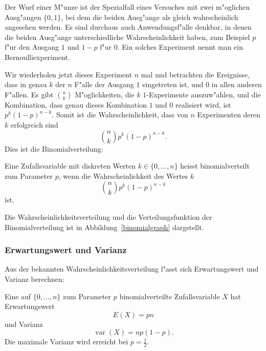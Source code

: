 Der Wurf einer M"unze ist der Spezialfall eines Versuches mit
zwei m"oglichen Ausg"angen $\{0,1\}$, bei dem die beiden Ausg"ange als
gleich wahrscheinlich angesehen werden. Es sind durchaus auch
Anwendungsf"alle denkbar, in denen die beiden Ausg"ange unterschiedliche
Wahrscheinlichkeit haben, zum Beispiel $p$ f"ur den Ausgang $1$ und $1-p$
f"ur $0$.
Ein solches Experiment nennt man ein Bernoulliexperiment.

Wir wiederholen jetzt dieses Experiment $n$ mal und betrachten die Ereignisse,
dass in genau $k$ der $n$ F"alle der Ausgang $1$ eingetreten ist,
und $0$ in allen anderen F"allen. Es gibt $\binom{n}{k}$ M"oglichkeiten,
die $k$ $1$-Experimente auszuw"ahlen, und die Kombination, dass genau
dieses Kombination $1$ und $0$ realisiert wird, ist $p^k(1-p)^{n-k}$.
Somit ist die Wahrscheinlichkeit, dass von $n$ Experimenten deren $k$
erfolgreich sind
\[
\binom{n}{k}p^k(1-p)^{n-k}.
\]
Dies ist die Binomialverteilung:
\begin{definition}
Eine Zufallsvariable mit diskreten Werten $k\in\{0,\dots,n\}$
heisst binomialverteilt zum Parameter $p$, wenn die Wahrscheinlichkeit
des Wertes $k$ 
\[
\binom{n}{k}p^k(1-p)^{n-k}
\]
ist.
\end{definition}

Die Wahrscheinlichkeitsverteilung und die Verteilungsfunktion der
Binomialverteilung ist in Abbildung~\ref{binomialgraph} dargstellt.

\subsubsection{Erwartungswert und Varianz}
Aus der bekannten Wahrscheinlichkeitsverteilung l"asst sich
Erwartungswert und Varianz berechnen:
\begin{satz}
Eine auf $\{0,\dots,n\}$ zum Parameter $p$ binomialverteilte Zufallsvariable
$X$ hat Erwartungswert
\[
E(X)=pn
\]
und Varianz
\[
\operatorname{var}(X)=np(1-p).
\]
Die maximale Varianz wird erreicht bei $p=\frac12$.
\end{satz}

